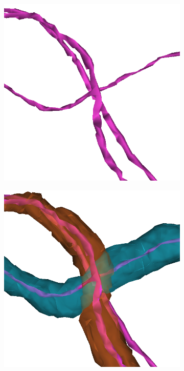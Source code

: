 \begin{figure}[htpb]
	\centering
	\begin{subfigure}[b]{0.24\textwidth}
		\centering
		\includegraphics[width=\textwidth]{data/images/splitNMatch/skel.png}
		\caption{\label{fig:splitNMatchA}}
	\end{subfigure}
	\hfill
	\begin{subfigure}[b]{0.24\textwidth}
		\centering
		\includegraphics[width=\textwidth]{data/images/splitNMatch/skelNSeg.png}

\end{subfigure}
\end{figure}
